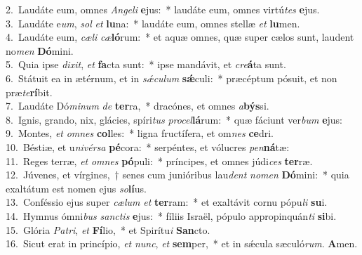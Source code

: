 {2.~}Laudáte eum, omnes \textit{An}\textit{ge}\textit{li} \textbf{e}jus:~* laudáte eum, omnes virtú\textit{tes} \textbf{e}jus.\\
{3.~}Laudáte e\textit{um}, \textit{sol} \textit{et} \textbf{lu}na:~* laudáte eum, omnes stellæ \textit{et} \textbf{lu}men.\\
{4.~}Laudáte eum, \textit{cæ}\textit{li} \textit{cæ}\textbf{ló}rum:~* et aquæ omnes, quæ super cælos sunt, laudent no\textit{men} \textbf{Dó}mini.\\
{5.~}Quia ipse \textit{di}\textit{xit}, \textit{et} \textbf{fa}cta sunt:~* ipse mandávit, et \textit{cre}\textbf{á}ta sunt.\\
{6.~}Státuit ea in ætérnum, et in \textit{sǽ}\textit{cu}\textit{lum} \textbf{sǽ}culi:~* præcéptum pósuit, et non præ\textit{te}\textbf{rí}bit.\\
{7.~}Laudáte Dó\textit{mi}\textit{num} \textit{de} \textbf{ter}ra,~* dracónes, et omnes \textit{a}\textbf{býs}si.\\
{8.~}Ignis, grando, nix, glácies, spíri\textit{tus} \textit{pro}\textit{cel}\textbf{lá}rum:~* quæ fáciunt ver\textit{bum} \textbf{e}jus:\\
{9.~}Montes, \textit{et} \textit{om}\textit{nes} \textbf{col}les:~* ligna fructífera, et om\textit{nes} \textbf{ce}dri.\\
{10.~}Béstiæ, et u\textit{ni}\textit{vér}\textit{sa} \textbf{pé}cora:~* serpéntes, et vólucres \textit{pen}\textbf{ná}tæ:\\
{11.~}Reges terræ, \textit{et} \textit{om}\textit{nes} \textbf{pó}puli:~* príncipes, et omnes júdi\textit{ces} \textbf{ter}ræ.\\
{12.~}Júvenes, et vírgines,~† senes cum junióribus lau\textit{dent} \textit{no}\textit{men} \textbf{Dó}mini:~* quia exaltátum est nomen ejus \textit{so}\textbf{lí}us.\\
{13.~}Conféssio ejus super \textit{cæ}\textit{lum} \textit{et} \textbf{ter}ram:~* et exaltávit cornu pópu\textit{li} \textbf{su}i.\\
{14.~}Hymnus ómni\textit{bus} \textit{san}\textit{ctis} \textbf{e}jus:~* fíliis Israël, pópulo appropinquán\textit{ti} \textbf{si}bi.\\
{15.~}Glória \textit{Pa}\textit{tri}, \textit{et} \textbf{Fí}lio,~* et Spirítu\textit{i} \textbf{San}cto.\\
{16.~}Sicut erat in princípio, \textit{et} \textit{nunc}, \textit{et} \textbf{sem}per,~* et in sǽcula sæculó\textit{rum}. \textbf{A}men.\\
